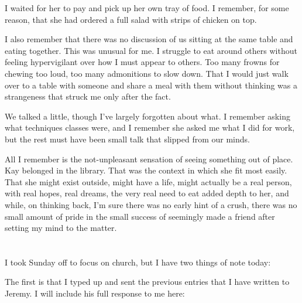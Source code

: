 I waited for her to pay and pick up her own tray of food. I remember, for some reason, that she had ordered a full salad with strips of chicken on top.

I also remember that there was no discussion of us sitting at the same table and eating together. This was unusual for me. I struggle to eat around others without feeling hypervigilant over how I must appear to others. Too many frowns for chewing too loud, too many admonitions to slow down. That I would just walk over to a table with someone and share a meal with them without thinking was a strangeness that struck me only after the fact.

We talked a little, though I've largely forgotten about what. I remember asking what techniques classes were, and I remember she asked me what I did for work, but the rest must have been small talk that slipped from our minds.

All I remember is the not-unpleasant sensation of seeing something out of place. Kay belonged in the library. That was the context in which she fit most easily. That she might exist outside, might have a life, might actually be a real person, with real hopes, real dreams, the very real need to eat added depth to her, and while, on thinking back, I'm sure there was no early hint of a crush, there was no small amount of pride in the small success of seemingly made a friend after setting my mind to the matter.

\section{}

I took Sunday off to focus on church, but I have two things of note today:

The first is that I typed up and sent the previous entries that I have written to Jeremy. I will include his full response to me here:

